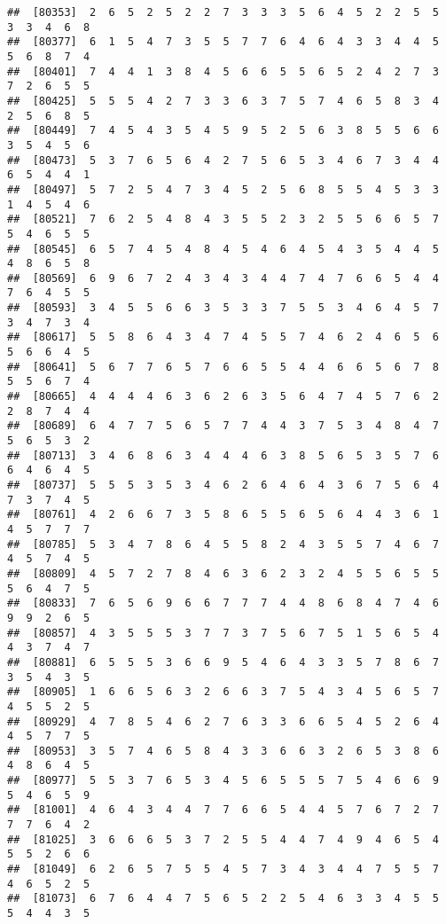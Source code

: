 \documentclass[
]{book}
\begin{document}
\begin{verbatim}
##  [80353]  2  6  5  2  5  2  2  7  3  3  3  5  6  4  5  2  2  5  5  3  3  4  6  8
##  [80377]  6  1  5  4  7  3  5  5  7  7  6  4  6  4  3  3  4  4  5  5  6  8  7  4
##  [80401]  7  4  4  1  3  8  4  5  6  6  5  5  6  5  2  4  2  7  3  7  2  6  5  5
##  [80425]  5  5  5  4  2  7  3  3  6  3  7  5  7  4  6  5  8  3  4  2  5  6  8  5
##  [80449]  7  4  5  4  3  5  4  5  9  5  2  5  6  3  8  5  5  6  6  3  5  4  5  6
##  [80473]  5  3  7  6  5  6  4  2  7  5  6  5  3  4  6  7  3  4  4  6  5  4  4  1
##  [80497]  5  7  2  5  4  7  3  4  5  2  5  6  8  5  5  4  5  3  3  1  4  5  4  6
##  [80521]  7  6  2  5  4  8  4  3  5  5  2  3  2  5  5  6  6  5  7  5  4  6  5  5
##  [80545]  6  5  7  4  5  4  8  4  5  4  6  4  5  4  3  5  4  4  5  4  8  6  5  8
##  [80569]  6  9  6  7  2  4  3  4  3  4  4  7  4  7  6  6  5  4  4  7  6  4  5  5
##  [80593]  3  4  5  5  6  6  3  5  3  3  7  5  5  3  4  6  4  5  7  3  4  7  3  4
##  [80617]  5  5  8  6  4  3  4  7  4  5  5  7  4  6  2  4  6  5  6  5  6  6  4  5
##  [80641]  5  6  7  7  6  5  7  6  6  5  5  4  4  6  6  5  6  7  8  5  5  6  7  4
##  [80665]  4  4  4  4  6  3  6  2  6  3  5  6  4  7  4  5  7  6  2  2  8  7  4  4
##  [80689]  6  4  7  7  5  6  5  7  7  4  4  3  7  5  3  4  8  4  7  5  6  5  3  2
##  [80713]  3  4  6  8  6  3  4  4  4  6  3  8  5  6  5  3  5  7  6  6  4  6  4  5
##  [80737]  5  5  5  3  5  3  4  6  2  6  4  6  4  3  6  7  5  6  4  7  3  7  4  5
##  [80761]  4  2  6  6  7  3  5  8  6  5  5  6  5  6  4  4  3  6  1  4  5  7  7  7
##  [80785]  5  3  4  7  8  6  4  5  5  8  2  4  3  5  5  7  4  6  7  4  5  7  4  5
##  [80809]  4  5  7  2  7  8  4  6  3  6  2  3  2  4  5  5  6  5  5  5  6  4  7  5
##  [80833]  7  6  5  6  9  6  6  7  7  7  4  4  8  6  8  4  7  4  6  9  9  2  6  5
##  [80857]  4  3  5  5  5  3  7  7  3  7  5  6  7  5  1  5  6  5  4  4  3  7  4  7
##  [80881]  6  5  5  5  3  6  6  9  5  4  6  4  3  3  5  7  8  6  7  3  5  4  3  5
##  [80905]  1  6  6  5  6  3  2  6  6  3  7  5  4  3  4  5  6  5  7  4  5  5  2  5
##  [80929]  4  7  8  5  4  6  2  7  6  3  3  6  6  5  4  5  2  6  4  4  5  7  7  5
##  [80953]  3  5  7  4  6  5  8  4  3  3  6  6  3  2  6  5  3  8  6  4  8  6  4  5
##  [80977]  5  5  3  7  6  5  3  4  5  6  5  5  5  7  5  4  6  6  9  5  4  6  5  9
##  [81001]  4  6  4  3  4  4  7  7  6  6  5  4  4  5  7  6  7  2  7  7  7  6  4  2
##  [81025]  3  6  6  6  5  3  7  2  5  5  4  4  7  4  9  4  6  5  4  5  5  2  6  6
##  [81049]  6  2  6  5  7  5  5  4  5  7  3  4  3  4  4  7  5  5  7  4  6  5  2  5
##  [81073]  6  7  6  4  4  7  5  6  5  2  2  5  4  6  3  3  4  5  5  5  4  4  3  5

\end{verbatim}
\end{document}
